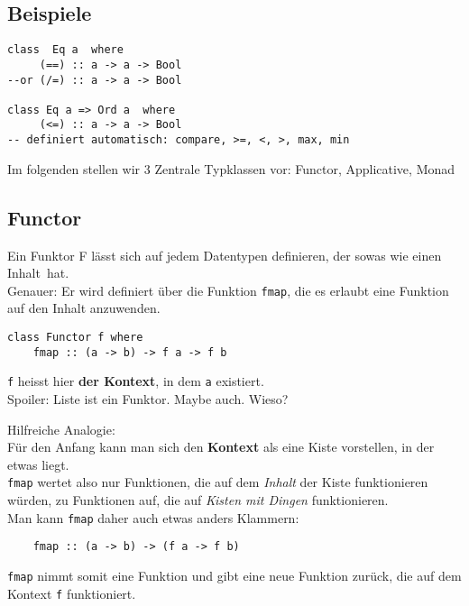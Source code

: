 \documentclass{beamer}
\begin{document}
\subsection{Beispiele}
\begin{frame}[fragile]
\begin{verbatim}
class  Eq a  where
     (==) :: a -> a -> Bool
--or (/=) :: a -> a -> Bool

class Eq a => Ord a  where
     (<=) :: a -> a -> Bool
-- definiert automatisch: compare, >=, <, >, max, min
\end{verbatim}
\pause
Im folgenden stellen wir 3 Zentrale Typklassen vor: Functor, Applicative, Monad
\end{frame}


\subsection{Functor}
\begin{frame}[fragile]
 Ein Funktor F lässt sich auf jedem Datentypen definieren, der sowas wie einen \glqq Inhalt\grqq \ hat.\\
 \pause
 Genauer: Er wird definiert über die Funktion \texttt{fmap}, die es erlaubt eine Funktion auf den Inhalt anzuwenden.
 \begin{verbatim}
class Functor f where
    fmap :: (a -> b) -> f a -> f b
 \end{verbatim}
 \texttt{f} heisst hier \textbf{der Kontext}, in dem \texttt{a} existiert.\\
\pause
\bigskip
Spoiler: Liste ist ein Funktor. Maybe auch. Wieso?
\end{frame}

\begin{frame}[fragile]
Hilfreiche Analogie:\\
Für den Anfang kann man sich den \textbf{Kontext} als eine Kiste vorstellen, in der etwas liegt.\\
\bigskip
\pause
\texttt{fmap} wertet also nur Funktionen, die auf dem \emph{Inhalt} der Kiste funktionieren würden, zu Funktionen auf, die auf \emph{Kisten mit Dingen} funktionieren.\\\bigskip
\pause
Man kann \texttt{fmap} daher auch etwas anders Klammern:
\begin{verbatim}
    fmap :: (a -> b) -> (f a -> f b)
\end{verbatim}
\texttt{fmap} nimmt somit eine Funktion und gibt eine neue Funktion zurück, die auf dem Kontext \texttt{f} funktioniert.
\end{frame}
\end{document}
